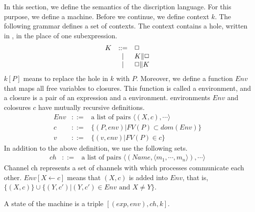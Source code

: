 In this section, we define the semantics of the discription language.
For this purpose, we define a machine.
Before we continue, we define context \(k\).
The following grammar defines a set of contexts.
The context contains a hole, written in \hole, in the place of one subexpression.
  \begin{displaymath}
    \begin{array}{lcl}
K     &::=& \mbox{$\Box$} \\
      & | & K\|\mbox{$\Box$}\\
      & | & \mbox{$\Box$}\|K
    \end{array}
  \end{displaymath}
$k[P]$ means to replace the hole in $k$ with $P$.
Moreover, we define a function $Env$ that maps all free variables to closures.
This function is called a environment, and a closure is a pair of an expression and a environment.
environments \(Env\) and colosures \(c\) have mutually recursive definitions.
  \begin{displaymath}
    \begin{array}{rcl}
Env &::=& \mbox{a list of pairs }\langle(X,c),\cdots\rangle\\
c &::=& \{(P,env)|FV(P)\subset dom(Env)\}\\
v &::=& \{(v,env)|FV(P)\in c\}
    \end{array}
  \end{displaymath}
In addition to the above definition, we use the following sets.
  \begin{displaymath}
    \begin{array}{rcl}
ch &::=&\mbox{a list of pairs }\langle(Name,\langle m_1,\cdots,m_n\rangle),\cdots\rangle
    \end{array}
  \end{displaymath}
Channel ch represents a set of channels with which processes communicate each other.
\(Env[X\leftarrow c]\) means that \((X,c)\) is added into \(Env\), that is, 
\(\{(X,c)\}\cup\{(Y,c')|(Y,c')\in Env \mbox{ and } X\neq Y\}\).

A state of the machine is a triple \([(exp,env),ch,k]\).


